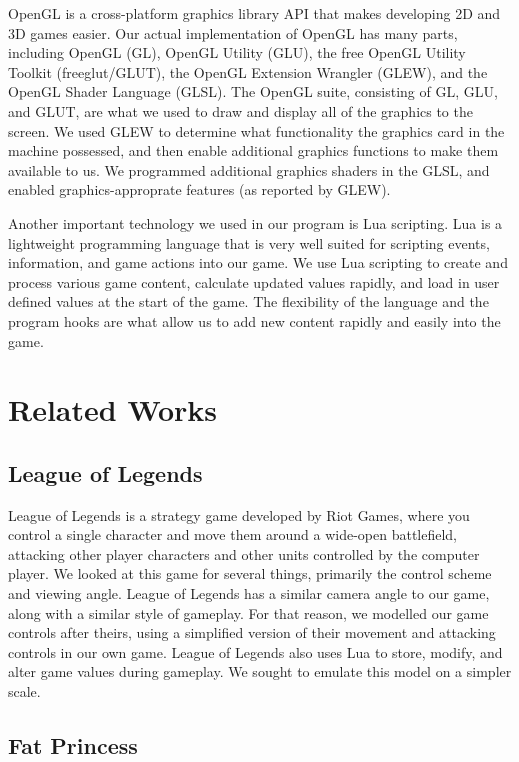 \documentclass{article}
\begin{document}
OpenGL is a cross-platform graphics library API that makes developing 2D and 3D
games easier. Our actual implementation of OpenGL has many parts, including
OpenGL (GL)\cite{gl}, OpenGL Utility (GLU), the free OpenGL Utility
Toolkit (freeglut/GLUT)\cite{freeglut}, the OpenGL Extension Wrangler
(GLEW)\cite{glew}, and the OpenGL Shader Language (GLSL)\cite{glsl}. The OpenGL
suite, consisting of GL, GLU, and GLUT, are what we used to draw and display all of the graphics to the screen. We used GLEW to
determine what functionality the graphics card in the machine possessed, and
then enable additional graphics functions to make them available to us. We
programmed additional graphics shaders in the GLSL, and enabled
graphics-approprate features (as reported by GLEW).

Another important technology we used in our program is Lua scripting.\cite{lua}
Lua is a lightweight programming language that is very well suited for scripting
events, information, and game actions into our game. We use Lua scripting to
create and process various game content, calculate updated values rapidly, and
load in user defined values at the start of the game. The flexibility of the
language and the program hooks are what allow us to add new content rapidly and
easily into the game.

\section{Related Works}

\subsection{League of Legends}

League of Legends is a strategy game developed by Riot Games, where
you control a single character and move them around a wide-open
battlefield, attacking other player characters and other units
controlled by the computer player. \cite{rofl} We looked at this game for several
things, primarily the control scheme and viewing angle. League of Legends has a
similar camera angle to our game, along with a similar style of gameplay. For
that reason, we modelled our game controls after theirs, using a simplified
version of their movement and attacking controls in our own game. League of
Legends also uses Lua to store, modify, and alter game values during gameplay.
We sought to emulate this model on a simpler scale.

\subsection{Fat Princess}
\end{document}
